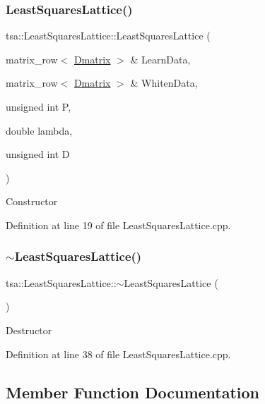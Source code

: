 \subsubsection{\texorpdfstring{Least\+Squares\+Lattice()}{LeastSquaresLattice()}}
{\footnotesize\ttfamily tsa\+::\+Least\+Squares\+Lattice\+::\+Least\+Squares\+Lattice (\begin{DoxyParamCaption}\item[{matrix\+\_\+row$<$ \hyperlink{namespacetsa_ad260cd21c1891c4ed391fe788569aba4}{Dmatrix} $>$ \&}]{Learn\+Data,  }\item[{matrix\+\_\+row$<$ \hyperlink{namespacetsa_ad260cd21c1891c4ed391fe788569aba4}{Dmatrix} $>$ \&}]{Whiten\+Data,  }\item[{unsigned int}]{P,  }\item[{double}]{lambda,  }\item[{unsigned int}]{D }\end{DoxyParamCaption})}

Constructor 

Definition at line 19 of file Least\+Squares\+Lattice.\+cpp.

\mbox{\label{classtsa_1_1_least_squares_lattice_a9a83bde1203dadf87892afcf25729081}} 
\subsubsection{\texorpdfstring{$\sim$\+Least\+Squares\+Lattice()}{~LeastSquaresLattice()}}
{\footnotesize\ttfamily tsa\+::\+Least\+Squares\+Lattice\+::$\sim$\+Least\+Squares\+Lattice (\begin{DoxyParamCaption}{ }\end{DoxyParamCaption})\hspace{0.3cm}{\ttfamily [virtual]}}

Destructor 

Definition at line 38 of file Least\+Squares\+Lattice.\+cpp.



\subsection{Member Function Documentation}
\mbox{\label{classtsa_1_1_least_squares_lattice_a768ad13ebc89f33b627cc04e5131f7b4}} 
